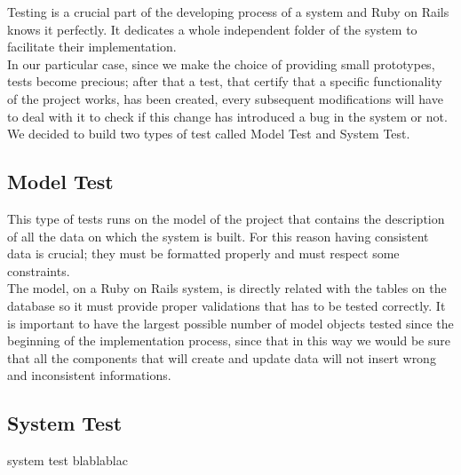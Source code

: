 Testing is a crucial part of the developing process of a system and Ruby on Rails knows it perfectly. It dedicates a whole independent folder of the system to facilitate their implementation. \\
In our particular case, since we make the choice of providing small prototypes, tests become precious; after that a test, that certify that a specific functionality of the project works, has been created, every subsequent modifications will have to deal with it to check if this change has introduced a bug in the system or not. \\
We decided to build two types of test called Model Test and System Test.

\subsection{Model Test}
This type of tests runs on the model of the project that contains the description of all the data on which the system is built. For this reason having consistent data is crucial; they must be formatted properly and must respect some constraints. \\
The model, on a Ruby on Rails system, is directly related with the tables on the database so it must provide proper validations that has to be tested correctly. It is important to have the largest possible number of model objects tested since the beginning of the implementation process, since that in this way we would be sure that all the components that will create and update data will not insert wrong and inconsistent informations. 

\subsection{System Test}
system test blablablac